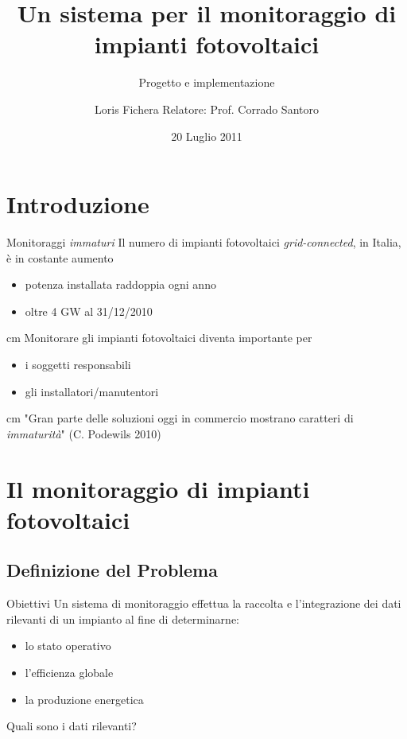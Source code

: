 \documentclass{beamer}
\title[Un sistema per il monitoraggio di impianti fotovoltaici]{
  Un sistema per il monitoraggio di \\ impianti fotovoltaici
 }\subtitle[]{Progetto e implementazione}
\author{Loris Fichera \n
Relatore: Prof. Corrado Santoro}
\institute[Universit\`a di Catania]{
	Universit\`a degli Studi di Catania\\
        Corso di Laurea Specialistica in Ingegneria Informatica\\
}
\date{20 Luglio 2011}
\newcommand{\N}{\vskip 0.3 cm}
\newcommand{\red}[1]{\textcolor[rgb]{.8,0,0}{#1}}
\newcommand{\green}[1]{\textcolor[rgb]{0,.6,.1}{#1}}
\begin{document}
\begin{frame}[plain]
  \titlepage
\end{frame}
%


\section{Introduzione}
\begin{frame}{Monitoraggi \emph{immaturi}}
  Il numero di impianti fotovoltaici \emph{grid-connected}, in Italia, \`e in costante aumento
  \begin{itemize}
    \item potenza installata \red{raddoppia} ogni anno
    \item oltre \red{4 GW} al 31/12/2010
  \end{itemize}
  \N
  Monitorare gli impianti fotovoltaici diventa importante per
    \begin{itemize}
    \item i \green{soggetti responsabili}
    \item gli \green{installatori/manutentori}
  \end{itemize}
  \N  
  "Gran parte delle soluzioni oggi in commercio mostrano caratteri di \emph{immaturit\`a}" (C. Podewils 2010)
\end{frame}
%

%
\section{Il monitoraggio di impianti fotovoltaici}
\subsection{Definizione del Problema}
\begin{frame}{Obiettivi}
Un sistema di monitoraggio effettua la \green{raccolta} e \green{l'integrazione} dei  \red{dati rilevanti} di un impianto al fine di
determinarne:
%
\begin{itemize}
\item lo stato operativo
\item l'efficienza globale
\item la produzione energetica
\end{itemize}
%
\begin{figure}[!h]
  \begin{center}
  \end{center}
\end{figure}
%
Quali sono i \red{dati rilevanti}?
\end{frame}
%
\end{document}
